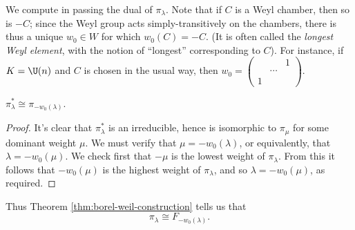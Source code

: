 \documentclass[reqno]{amsart} 
\begin{document}
We compute in passing the dual of $\pi_\lambda$.  Note that if $C$ is a Weyl chamber, then so is $-C$; since the Weyl group acts simply-transitively on the chambers, there is thus a unique $w_0 \in W$ for which $w_0(C) = - C$.  (It is often called the \emph{longest Weyl element}, with the notion of ``longest'' corresponding to $C$).  For instance, if $K = \U(n)$ and $C$ is chosen in the usual way, then $w_0 = 
\begin{pmatrix}
  &  & 1 \\
  & \dotsb &  \\
  1 & &
\end{pmatrix}
$.
\begin{lemma}
  $\pi_\lambda^* \cong \pi_{-w_0(\lambda)}$.
\end{lemma}
\begin{proof}
  It's clear that $\pi_\lambda^*$ is an irreducible, hence is isomorphic to $\pi_{\mu}$ for some dominant weight $\mu$.  We must verify that $\mu = - w_0 (\lambda)$, or equivalently, that $\lambda = - w_0(\mu)$.  We check first that $-\mu$ is the lowest weight of $\pi_\lambda$.  From this it follows that $- w_0 (\mu)$ is the highest weight of $\pi_\lambda$, and so $\lambda = - w_0(\mu)$, as required.
\end{proof}
Thus Theorem \ref{thm:borel-weil-construction} tells us that
\begin{equation*}
  \pi_{\lambda}
  \cong F_{-w_0(\lambda)}.
\end{equation*}
\end{document}
